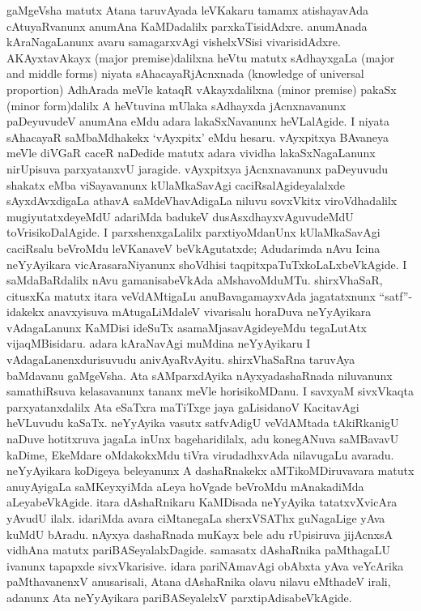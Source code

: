 gaMgeVsha matutx Atana taruvAyada leVKakaru tamamx atishayavAda cAtuyaR\-vanunx anumAna KaMDadalilx parxkaTisidAdxre. anumAnada kAraNagaLanunx avaru samagarxvAgi vishelxVSisi vivarisidAdxre. AKAyxtavAkayx ({\rm major premise})dalilxna heVtu matutx sAdhayxgaLa ({\rm major and middle forms}) niyata sAhacayaRjAcnxnada ({\rm knowledge of universal proportion}) AdhArada meVle kataqR vAkayxdalilxna ({\rm minor premise}) pakaSx ({\rm minor form})dalilx A heVtuvina mUlaka sAdhayxda jAcnxnavanunx paDeyuvudeV anumAna eMdu adara lakaSxNavanunx heVLalAgide. I niyata sAhacayaR saMbaMdhakekx `vAyxpitx' eMdu hesaru. vAyxpitxya BAvaneya meVle diVGaR caceR naDedide matutx adara vividha lakaSxNagaLanunx nirUpisuva parxyatanxvU jaragide. vAyxpitxya jAcnxnavanunx paDeyuvudu shakatx eMba viSayavanunx kUlaMkaSavAgi caciRsalAgideyalalxde sAyxdAvxdigaLa athavA saMdeVhavAdigaLa niluvu sovxVkitx viroVdhadalilx mugiyutatxdeyeMdU adariMda badukeV dusAsxdhayxvAguvudeMdU toVrisikoDalAgide. I parxshenxgaLalilx parxtiyoMdanUnx kUlaMkaSavAgi caciRsalu beVroMdu leVKanaveV beVkAgutatxde; Adudarimda nAvu Icina neYyAyikara vicArasaraNiyanunx shoVdhisi taqpitxpaTuTxkoLaLxbeVkAgide. I saMdaBaRdalilx nAvu gamanisabeVkAda aMshavoMduMTu. shirxVhaSaR, citusxKa matutx itara veVdAMtigaLu anuBavagamayxvAda jagatatxnunx ``satf''-idakekx anavxyisuva mAtugaLiMdaleV vivarisalu horaDuva neYyAyikara vAdagaLanunx KaMDisi ideSuTx asamaMjasavAgideyeMdu tegaLutAtx vijaqMBisidaru. adara kAraNavAgi muMdina neYyAyikaru I vAdagaLanenxdurisuvudu anivAyaRvAyitu. shirxVhaSaRna taruvAya baMdavanu gaMgeVsha. Ata sAMparxdAyika nAyxyadashaRnada niluvanunx samathiRsuva kelasavanunx tananx meVle horisikoMDanu. I savxyaM sivxVkaqta parxyatanxdalilx Ata eSaTxra maTiTxge jaya gaLisidanoV KacitavAgi heVLuvudu kaSaTx. neYyAyika vasutx satfvAdigU veVdAMtada tAkiRkanigU naDuve hotitxruva jagaLa inUnx bageharidilalx, adu konegANuva saMBavavU kaDime, EkeMdare oMdakokxMdu tiVra virudadhxvAda nilavugaLu avaradu. neYyAyikara koDigeya beleyanunx A dashaRnakekx aMTikoMDiruvavara matutx anuyAyigaLa saMKeyxyiMda aLeya hoVgade beVroMdu mAnakadiMda aLeyabeVkAgide. itara dAshaRnikaru KaMDisada neYyAyika tatatxvXvicAra yAvudU ilalx. idariMda avara ciMtanegaLa sherxVSAThx guNagaLige yAva kuMdU bAradu. nAyxya dashaRnada muKayx bele adu rUpisiruva jijAcnxsA vidhAna matutx pariBASeyalalxDagide. samasatx dAshaRnika paMthagaLU ivanunx tapapxde sivxVkarisive. idara pariNAmavAgi obAbxta yAva veYcArika paMthavanenxV anusarisali, Atana dAshaRnika olavu nilavu eMthadeV irali, adanunx Ata neYyAyikara pariBASeyalelxV parxtipAdisabeVkAgide.

